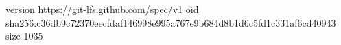 version https://git-lfs.github.com/spec/v1
oid sha256:c36db9c72370eecfdaf146998e995a767e9b684d8b1d6c5fd1c331af6cd40943
size 1035
